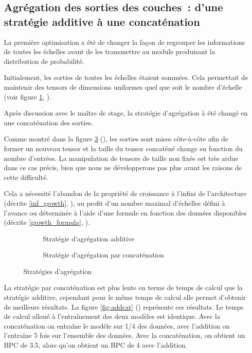 \subsection[Agrégation des sorties des couches]{Agrégation des sorties des couches~: d'une stratégie additive à une concaténation}\label{subsec:addcat_}
La première optimisation a été de changer la façon de regrouper les informations de toutes les \og échelles\fg{} avant de les transmettre au module produisant la distribution de probabilité.

Initialement, les sorties de toutes les \og échelles\fg{} étaient sommées. Cela permettait de maintenir des \glspl{tensor} de dimensions uniformes quel que soit le nombre d'\og échelle\fg{} (voir figure \ref{fig:add}, ).

Après discussion avec le maître de stage, la stratégie d'agrégation à été changé en une concaténation des sorties.

Comme montré dans la figure \ref{fig:cat} (), les sorties sont mises côte-à-côte afin de former un nouveau \gls{tensor} et la taille du \gls{tensor} concaténé change en fonction du nombre d'entrées.
La manipulation de \glspl{tensor} de taille non fixée est très ardue dans ce cas précis, bien que nous ne développerons pas plus avant les raisons de cette difficulté.

Cela a nécessité l'abandon de la propriété de croissance à l'infini de l'architecture (décrite \autoref{inf_growth}, ), au profit d'un nombre maximal d'échelles défini à l'avance ou déterminée à l'aide d'une formule en fonction des données disponibles (décrite \mbox{\autoref{growth_formula}}, ).

\begin{figure}[ht]
	\begin{subfigure}{0.45\textwidth}
		\centering
		\scalebox{1}{}
		\caption[Stratégie d'agrégation additive]{Stratégie d'agrégation additive}\label{fig:add}
	\end{subfigure}
	\begin{subfigure}{0.45\textwidth}
		\centering
		\scalebox{1}{}
		\caption[Stratégie d'agrégation par concaténation]{Stratégie d'agrégation par concaténation}\label{fig:cat}
	\end{subfigure} 
	\caption{Stratégies d'agrégation}
\end{figure}

La stratégie par concaténation est plus lente en terme de temps de calcul que la stratégie additive, cependant pour le même temps de calcul elle permet d'obtenir de meilleurs résultats. La figure \ref{fig:addcat} () représente ces résultats. Le temps de calcul alloué à l'entraînement des deux modèles est identique. Avec la concaténation on entraîne le modèle sur 1/4 des données, avec l'addition on l'entraîne 5 fois sur l'ensemble des données. Avec la concaténation, on obtient un BPC de 3.5, alors qu'on obtient un BPC de 4 avec l'addition.

